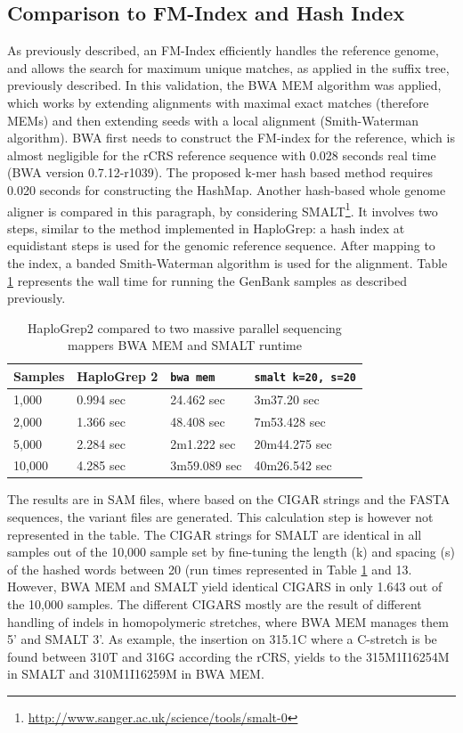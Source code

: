 \subsection{Comparison to FM-Index and Hash Index}
As previously described, an FM-Index efficiently handles the reference genome, and allows the search for maximum unique matches, as applied in the suffix tree, previously described. In this validation, the BWA MEM\cite{Li2012a} algorithm was applied, which works by extending alignments with maximal exact matches (therefore MEMs) and then extending seeds with a local alignment (Smith-Waterman algorithm).    
BWA first needs to construct the FM-index for the reference, which is almost negligible for the rCRS reference sequence with 0.028 seconds real time (BWA version 0.7.12-r1039). The proposed k-mer hash based method requires 0.020 seconds for constructing the HashMap. Another hash-based whole genome aligner is compared in this paragraph, by considering SMALT\footnote{\url{http://www.sanger.ac.uk/science/tools/smalt-0}}. 
It involves two steps, similar to the method implemented in HaploGrep: a hash index at equidistant steps is used for the genomic reference sequence. After mapping to the index, a banded Smith-Waterman algorithm is used for the alignment. Table \ref{time:BWA:SMALT} represents the wall time for running the GenBank samples as described previously. 
\begin{table}[H]
\centering
\caption{HaploGrep2 compared to two massive parallel sequencing mappers BWA MEM and SMALT runtime}
\label{time:BWA:SMALT}
\begin{tabular}{|l|l|l|l|}
\hline
Samples &  HaploGrep 2 &  \texttt{bwa mem}  &  \texttt{smalt k=20, s=20} \\ \hline
1,000  & 0.994 sec     & 24.462 sec  &    3m37.20 sec \\ \hline
2,000  & 1.366 sec    & 48.408 sec  &    7m53.428 sec \\ \hline
5,000  & 2.284 sec    & 2m1.222 sec &   20m44.275 sec \\ \hline
10,000 & 4.285 sec    & 3m59.089 sec  &  40m26.542 sec  \\ \hline 
\end{tabular}
\end{table}
The results are in SAM files, where based on the CIGAR strings and the FASTA sequences, the variant files are generated. This calculation step is however not represented in the table. 
The CIGAR strings for SMALT are identical in all samples out of the 10,000 sample set by fine-tuning the length (k) and spacing (s) of the hashed words between 20 (run times represented in Table \ref{time:BWA:SMALT} and 13. However, BWA MEM and SMALT yield identical CIGARS in only 1.643 out of the 10,000 samples. The different CIGARS mostly are the result of different handling of indels in homopolymeric stretches, where BWA MEM manages them 5' and SMALT 3'. As example, the insertion on 315.1C where a C-stretch is be found between 310T and 316G according the rCRS, yields to the 315M1I16254M in SMALT and 310M1I16259M in BWA MEM.


